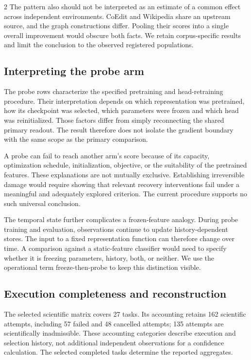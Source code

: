 \documentclass[a4paper,10pt]{article}
\begin{document}
\begin{multicols}{2}
The pattern also should not be interpreted as an estimate of a common effect across independent environments. CoEdit and Wikipedia share an upstream source, and the graph constructions differ. Pooling their scores into a single overall improvement would obscure both facts. We retain corpus-specific results and limit the conclusion to the observed registered populations.

\subsection{Interpreting the probe arm}
The probe rows characterize the specified pretraining and head-retraining procedure. Their interpretation depends on which representation was pretrained, how its checkpoint was selected, which parameters were frozen and which head was reinitialized. Those factors differ from simply reconnecting the shared primary readout. The result therefore does not isolate the gradient boundary with the same scope as the primary comparison.

A probe can fail to reach another arm's score because of its capacity, optimization schedule, initialization, objective, or the suitability of the pretrained features. These explanations are not mutually exclusive. Establishing irreversible damage would require showing that relevant recovery interventions fail under a meaningful and adequately explored criterion. The current procedure supports no such universal conclusion.

The temporal state further complicates a frozen-feature analogy. During probe training and evaluation, observations continue to update history-dependent stores. The input to a fixed representation function can therefore change over time. A comparison against a static-feature classifier would need to specify whether it is freezing parameters, history, both, or neither. We use the operational term freeze-then-probe to keep this distinction visible.

\subsection{Execution completeness and reconstruction}
The selected scientific matrix covers 27 tasks. Its accounting retains 162 scientific attempts, including 57 failed and 48 cancelled attempts; 135 attempts are scientifically inadmissible. These accounting categories describe execution and selection history, not additional independent observations for a confidence calculation. The selected completed tasks determine the reported aggregates.


\end{multicols}
\end{document}
